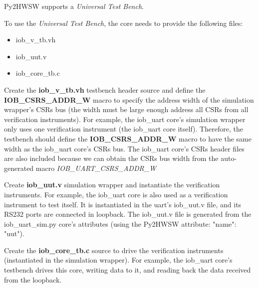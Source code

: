 %

Py2HWSW supports a \textit{Universal Test Bench}.

To use the \textit{Universal Test Bench}, the core needs to provide the following files:
\begin{itemize}
  \item iob\_v\_tb.vh
  \item iob\_uut.v
  \item iob\_core\_tb.c
\end{itemize}


Create the \textbf{iob\_v\_tb.vh} testbench header source and define the \textbf{IOB\_CSRS\_ADDR\_W} macro to specify the address width of the simulation wrapper's CSRs bus (the width must be large enough address all CSRs from all verification instruments).
For example, the iob\_uart core's simulation wrapper only uses one verification instrument (the iob\_uart core itself). Therefore, the testbench should define the \textbf{IOB\_CSRS\_ADDR\_W} macro to have the same width as the iob\_uart core's CSRs bus.
The iob\_uart core's CSRs header files are also included because we can obtain the CSRs bus width from the auto-generated macro \textit{IOB\_UART\_CSRS\_ADDR\_W}


Create \textbf{iob\_uut.v} simulation wrapper and instantiate the verification instruments.
For example, the iob\_uart core is also used as a verification instrument to test itself. It is instantiated in the uart's iob\_uut.v file, and its RS232 ports are connected in loopback. The iob\_uut.v file is generated from the iob\_uart\_sim.py core's attributes (using the Py2HWSW attribute: "name": "uut").


Create the \textbf{iob\_core\_tb.c} source to drive the verification instruments (instantiated in the simulation wrapper).
For example, the iob\_uart core's testbench drives this core, writing data to it, and reading back the data received from the loopback.


